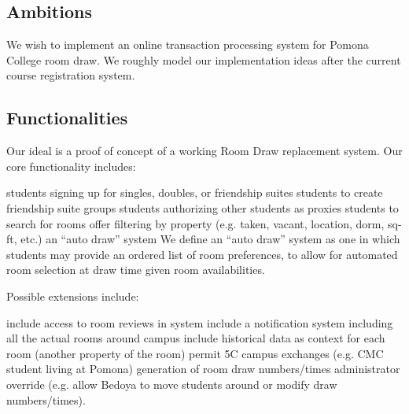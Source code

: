 \subsection{Ambitions}

We wish to implement an online transaction processing system for Pomona College
room draw. We roughly model our implementation ideas after the current course
registration system.

\subsection{Functionalities}

Our ideal is a proof of concept of a working Room Draw replacement system. Our
core functionality includes:

\begin{outline}
\1 students signing up for singles, doubles, or friendship suites
\1 students to create friendship suite groups
\1 students authorizing other students as proxies
\1 students to search for rooms
    \2 offer filtering by property (e.g. taken, vacant, location, dorm, sq-ft,
    etc.)
\1 an ``auto draw'' system
    \2 We define an ``auto draw'' system as one in which students may provide an
    ordered list of room preferences, to allow for automated room selection at
    draw time given room availabilities.
\end{outline}

Possible extensions include:

\begin{outline}
\1 include access to room reviews in system
\1 include a notification system
\1 including all the actual rooms around campus
\1 include historical data as context for each room (another property of the
    room)
\1 permit 5C campus exchanges (e.g. CMC student living at Pomona)
\1 generation of room draw numbers/times
\1 administrator override (e.g. allow Bedoya to move students around or modify
    draw numbers/times).
\end{outline}